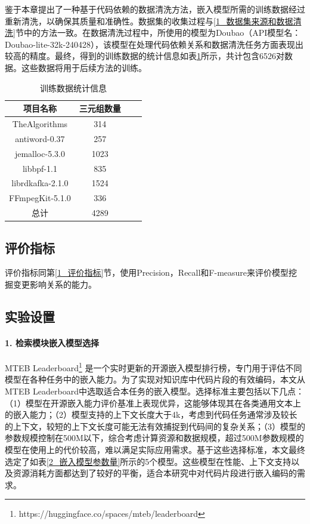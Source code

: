 鉴于本章提出了一种基于代码依赖的数据清洗方法，嵌入模型所需的训练数据经过重新清洗，以确保其质量和准确性。数据集的收集过程与\ref{1_数据集来源和数据清洗}节中的方法一致。在数据清洗过程中，所使用的模型为Doubao（API模型名：Doubao-lite-32k-240428），该模型在处理代码依赖关系和数据清洗任务方面表现出较高的精度。最终，得到的训练数据的统计信息如表\ref{1_数据集统计信息}所示，共计包含6526对数据。这些数据将用于后续方法的训练。


\begin{table}[htbp]
\caption{训练数据统计信息}
\label{1_数据集统计信息}
\vspace{0.5em}\centering\wuhao
\begin{tabular}{cccc}
\toprule
项目名称 & 三元组数量 \\
\midrule
TheAlgorithms    & 314   \\
antiword-0.37    & 257   \\
jemalloc-5.3.0   & 1023   \\
libbpf-1.1       & 835   \\
librdkafka-2.1.0 & 1524  \\
FFmpegKit-5.1.0  & 336   \\ 
总计              & 4289  \\
\bottomrule
\end{tabular}
\end{table}

\subsection{评价指标} 
评价指标同第\ref{1_评价指标}节，使用Precision，Recall和F-measure来评价模型挖掘变更影响关系的能力。

\subsection{实验设置}

\paragraph{1. 检索模块嵌入模型选择}
MTEB Leaderboard\footnote{https://huggingface.co/spaces/mteb/leaderboard} 是一个实时更新的开源嵌入模型排行榜，专门用于评估不同模型在各种任务中的嵌入能力。为了实现对知识库中代码片段的有效编码，本文从MTEB Leaderboard中选取适合本任务的嵌入模型。选择标准主要包括以下几点：（1）模型在开源嵌入能力评价基准上表现优异，这能够体现其在各类通用文本上的嵌入能力；（2）模型支持的上下文长度大于4k，考虑到代码任务通常涉及较长的上下文，较短的上下文长度可能无法有效捕捉到代码间的复杂关系；（3）模型的参数规模控制在500M以下，综合考虑计算资源和数据规模，超过500M参数规模的模型在使用上的代价较高，难以满足实际应用需求。基于这些选择标准，本文最终选定了如表\ref{2_嵌入模型参数量}所示的5个模型。这些模型在性能、上下文支持以及资源消耗方面都达到了较好的平衡，适合本研究中对代码片段进行嵌入编码的需求。
    
